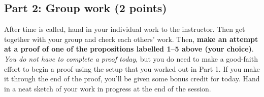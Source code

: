 \documentclass[11pt]{article}
\newtheorem{proposition}{Proposition}
\begin{document}
\subsection*{Part 2: Group work (2 points)}

After time is called, hand in your individual work to the instructor. Then get together with your group and check each others' work. Then, \textbf{make an attempt at a proof of one of the propositions labelled 1--5 above (your choice)}. \emph{You do not have to complete a proof today}, but you do need to make a good-faith effort to begin a proof using the setup that you worked out in Part 1. If you make it through the end of the proof, you'll be given some bonus credit for today. Hand in a neat sketch of your work in progress at the end of the session. 


% 
% 
% 
% 
% 
% 
% 
% 
% 
% 
% 
% 
% 
% 	
% 
% 
% 
% 
% 
% 
\end{document}
